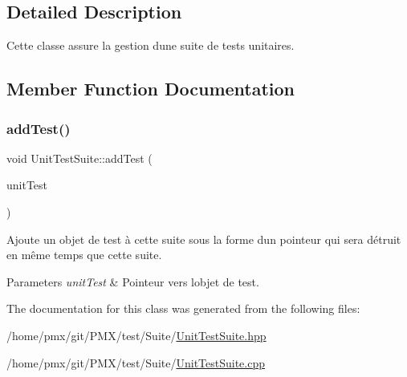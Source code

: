 \subsection{Detailed Description}
Cette classe assure la gestion d\textquotesingle{}une suite de tests unitaires. 

\subsection{Member Function Documentation}
\mbox{\label{classUnitTestSuite_aa2dda6bd93f28e28eb8fe333ba5ac16a}} 
\subsubsection{\texorpdfstring{add\+Test()}{addTest()}}
{\footnotesize\ttfamily void Unit\+Test\+Suite\+::add\+Test (\begin{DoxyParamCaption}\item[{\hyperlink{classUnitTest}{Unit\+Test} $\ast$}]{unit\+Test }\end{DoxyParamCaption})\hspace{0.3cm}{\ttfamily [inline]}}



Ajoute un objet de test à cette suite sous la forme d\textquotesingle{}un pointeur qui sera détruit en même temps que cette suite. 


\begin{DoxyParams}{Parameters}
{\em unit\+Test} & Pointeur vers l\textquotesingle{}objet de test. \\
\hline
\end{DoxyParams}


The documentation for this class was generated from the following files\+:\begin{DoxyCompactItemize}
\item 
/home/pmx/git/\+P\+M\+X/test/\+Suite/\hyperlink{UnitTestSuite_8hpp}{Unit\+Test\+Suite.\+hpp}\item 
/home/pmx/git/\+P\+M\+X/test/\+Suite/\hyperlink{UnitTestSuite_8cpp}{Unit\+Test\+Suite.\+cpp}\end{DoxyCompactItemize}
